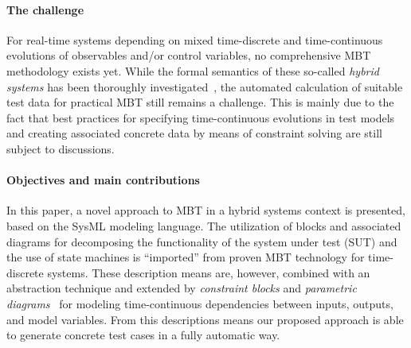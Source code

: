 \paragraph{The challenge}
For real-time systems depending on mixed time-discrete and time-continuous
evolutions of observables and/or control variables,  
no comprehensive MBT methodology exists yet. While the formal semantics of 
these so-called \emph{hybrid systems}   has been thoroughly 
investigated~\cite{Hen96,alur01hierarchical},
the automated calculation of suitable test data for practical MBT
still remains a challenge. This is mainly due to the fact that best practices for
specifying time-continuous evolutions in test models and creating associated concrete
data by means of constraint solving are still subject to discussions. 


\paragraph{Objectives and main contributions}
In this paper, a novel approach to MBT in a hybrid systems context is presented, based
on the SysML modeling language. The utilization of blocks and associated diagrams for 
decomposing the functionality of the system under test (SUT) and the use of state machines
 is ``imported'' from proven MBT technology for time-discrete systems. 
These description means are, however, combined with an abstraction technique and 
extended by \emph{constraint blocks} and
\emph{parametric diagrams}~\cite[Section~10]{SysML15} for modeling time-continuous dependencies between inputs, outputs, and model variables.
From this descriptions means our proposed approach is able to generate concrete test cases in a fully automatic way.




